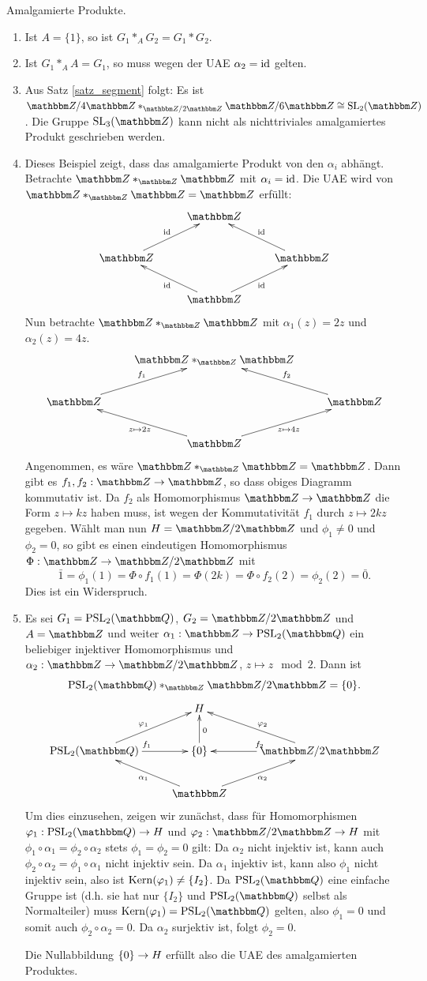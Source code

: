 \documentclass[a4paper, 12pt, twoside]{article}
\begin{document}
\BSP Amalgamierte Produkte.\label{bsp_amprod}
\begin{enumerate}
\item Ist $A=\{1\}$, so ist $G_1*_A G_2=G_1*G_2$.
\item Ist $G_1*_A A=G_1$, so muss wegen der UAE $\alpha_2=\mathrm{id}$ 
gelten.
\item Aus Satz \ref{satz_segment} folgt:
Es ist $\ZZ/4\ZZ *_{\ZZ/2\ZZ} \ZZ/6\ZZ\cong\SL_2(\ZZ)$.
Die Gruppe $\SL_3(\ZZ)$ kann nicht als nichttriviales amalgamiertes
Produkt geschrieben werden.
\item Dieses Beispiel zeigt, dass das amalgamierte Produkt von
den $\alpha_i$ abhängt. Betrachte $\ZZ*_{\ZZ} \ZZ$
mit $\alpha_i=\mathrm{id}$.
Die UAE wird von $\ZZ*_{\ZZ} \ZZ=\ZZ$ erfüllt:
\[\xymatrix{
& \ZZ & \\
\ZZ \ar[ur]^{\id} & & \ZZ \ar[ul]_{\id} \\
& \ZZ \ar[ul]^{\id} \ar[ur]_{\id} &
}\]
Nun betrachte $\ZZ*_{\ZZ}\ZZ$ mit $\alpha_1(z)=2z$ und
$\alpha_2(z)=4z$.
\[\xymatrix{
& \ZZ*_{\ZZ}\ZZ & \\
\ZZ \ar[ur]^{f_1} & & \ZZ \ar[ul]_{f_2} \\
& \ZZ \ar[ul]^{z\mapsto 2z} \ar[ur]_{z\mapsto 4z} &
}\]
Angenommen, es wäre $\ZZ *_{\ZZ}\ZZ=\ZZ$. Dann gibt es
$f_1,f_2:\ZZ\Ra\ZZ$, so dass obiges Diagramm kommutativ ist.
Da $f_2$ als Homomorphismus $\ZZ\Ra\ZZ$ die Form $z\mapsto kz$
haben muss, ist wegen der Kommutativität $f_1$ durch
$z\mapsto 2kz$ gegeben.
Wählt man nun $H=\ZZ/2\ZZ$ und $\phi_1\neq 0$ und $\phi_2=0$,
so gibt es einen eindeutigen Homomorphismus $\Phi:\ZZ\Ra\ZZ/2\ZZ$
mit
\[
\bar{1} = \phi_1(1) = \Phi\circ f_1(1) = \Phi(2k) = \Phi \circ f_2(2)
= \phi_2(2) = \bar{0}.
\]
Dies ist ein Widerspruch.
\item Es sei $G_1=\PSL_2(\QQ)$, $G_2=\ZZ/2\ZZ$ und $A=\ZZ$ und weiter
$\alpha_1:\ZZ\Ra \PSL_2(\QQ)$ ein beliebiger injektiver Homomorphismus
und $\alpha_2:\ZZ\Ra \ZZ/2\ZZ$, $z\mapsto z\mod 2$.
Dann ist
\[
\PSL_2(\QQ)*_{\ZZ} \ZZ/2\ZZ = \{ 0 \}.
\]
\[\xymatrix{
& H & \\
\PSL_2(\QQ) \ar[r]^{f_1} \ar[ur]^{\phi_1} &
	\{0\} \ar[u]_{0} &
	\ZZ/2\ZZ \ar[l]_{f_2} \ar[ul]_{\phi_2}\\
& \ZZ \ar[ul]^{\alpha_1} \ar[ur]_{\alpha_2} &
}\]
Um dies einzusehen, zeigen wir zunächst, dass für Homomorphismen
$\phi_1:\PSL_2(\QQ)\Ra H$ und $\phi_2:\ZZ/2\ZZ\Ra H$ mit
$\phi_1\circ\alpha_1=\phi_2\circ\alpha_2$ stets
$\phi_1=\phi_2=0$ gilt: Da $\alpha_2$ nicht injektiv ist, kann
auch $\phi_2\circ\alpha_2=\phi_1\circ\alpha_1$ nicht injektiv sein.
Da $\alpha_1$ injektiv ist, kann also $\phi_1$ nicht injektiv sein,
also ist $\mathrm{Kern}(\varphi_1)\neq\{I_2\}$.
Da $\PSL_2(\QQ)$ eine einfache Gruppe ist (d.h. sie hat nur
$\{I_2\}$ und $\PSL_2(\QQ)$ selbst als Normalteiler) muss
$\K{\phi_1}=\PSL_2(\QQ)$ gelten, also $\phi_1=0$ und somit
auch $\phi_2\circ\alpha_2=0$. Da $\alpha_2$ surjektiv ist,
folgt $\phi_2=0$.

Die Nullabbildung $\{0\}\rightarrow H$ erfüllt also die UAE des amalgamierten
Produktes.
\end{enumerate}
\end{document}
